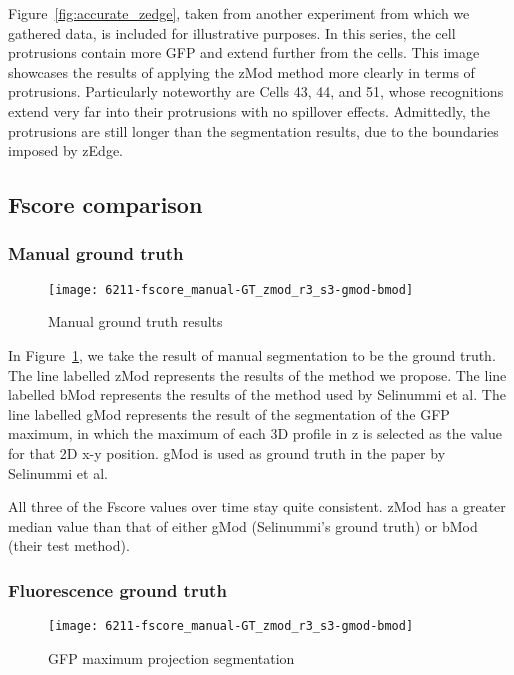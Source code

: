 Figure~\ref{fig:accurate_zedge}, taken from another experiment from which we gathered data, is included for illustrative purposes. In this series, the cell protrusions contain more GFP and extend further from the cells. This image showcases the results of applying the zMod method more clearly in terms of protrusions. Particularly noteworthy are Cells 43, 44, and 51, whose recognitions extend very far into their protrusions with no spillover effects. Admittedly, the protrusions are still longer than the segmentation results, due to the boundaries imposed by zEdge.

\subsection{Fscore comparison}

\subsubsection{Manual ground truth}

\begin{figure}[htbp!]
\centering
\texttt{[image: 6211-fscore\_manual-GT\_zmod\_r3\_s3-gmod-bmod]}
\caption{Manual ground truth results}
\label{fig:manual_ground}
\end{figure}

In Figure~\ref{fig:manual_ground}, we take the result of manual segmentation to be the ground truth. The line labelled zMod represents the results of the method we propose. The line labelled bMod represents the results of the method used by Selinummi et al. The line labelled gMod represents the result of the segmentation of the GFP maximum, in which the maximum of each 3D profile in z is selected as the value for that 2D x-y position. gMod is used as ground truth in the paper by Selinummi et al.

All three of the Fscore values over time stay quite consistent. zMod has a greater median value than that of either gMod (Selinummi's ground truth) or bMod (their test method).

\subsubsection{Fluorescence ground truth}

\begin{figure}[htbp!]
\centering
\texttt{[image: 6211-fscore\_manual-GT\_zmod\_r3\_s3-gmod-bmod]}
\caption{GFP maximum projection segmentation}
\label{fig:gfp_maximum}
\end{figure}

